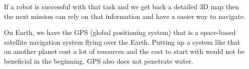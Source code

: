 If a robot is successful with that task and we get back a detailed 3D map then the next mission can rely on that information and have a easier way to navigate. 

On Earth, we have the GPS (global positioning system) that is a space-based satellite navigation system flying over the Earth\cite{gpsgeneral}. Putting up a system like that on another planet cost a lot of resources and the cost to start with would not be beneficial in the beginning. GPS also does not penetrate water\cite{underwatergps}. 